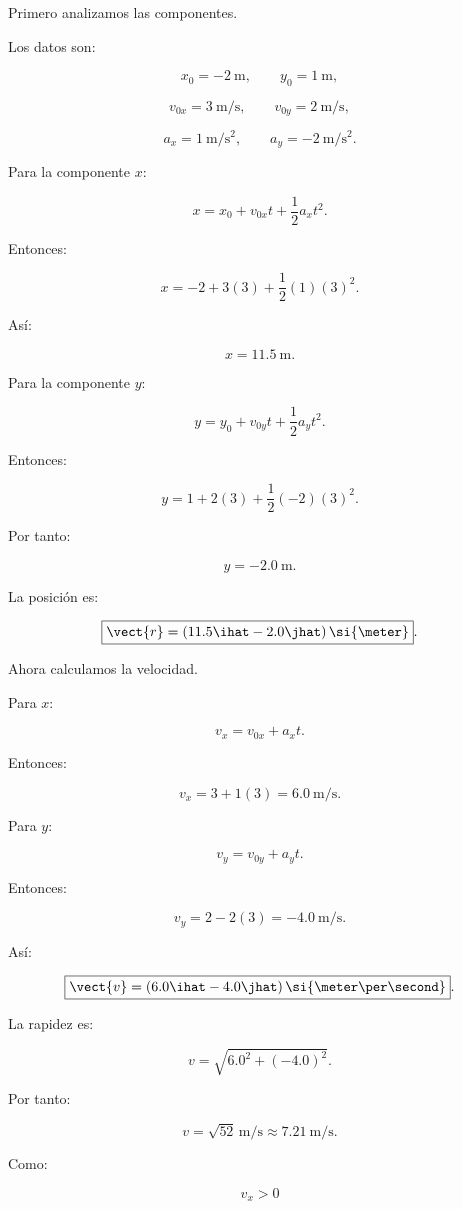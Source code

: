 Primero analizamos las componentes.

Los datos son:

\[
x_0=-\SI{2}{\meter},
\qquad
y_0=\SI{1}{\meter},
\]

\[
v_{0x}=\SI{3}{\meter\per\second},
\qquad
v_{0y}=\SI{2}{\meter\per\second},
\]

\[
a_x=\SI{1}{\meter\per\second\squared},
\qquad
a_y=-\SI{2}{\meter\per\second\squared}.
\]

Para la componente \(x\):

\[
x
=
x_0+v_{0x}t+\frac{1}{2}a_xt^2.
\]

Entonces:

\[
x
=
-2+3(3)+\frac{1}{2}(1)(3)^2.
\]

Así:

\[
x=\SI{11.5}{\meter}.
\]

Para la componente \(y\):

\[
y
=
y_0+v_{0y}t+\frac{1}{2}a_yt^2.
\]

Entonces:

\[
y
=
1+2(3)+\frac{1}{2}(-2)(3)^2.
\]

Por tanto:

\[
y=-\SI{2.0}{\meter}.
\]

La posición es:

\[
\boxed{
\vect{r}
=
(11.5\ihat-2.0\jhat)\,\si{\meter}
}.
\]

Ahora calculamos la velocidad.

Para \(x\):

\[
v_x
=
v_{0x}+a_xt.
\]

Entonces:

\[
v_x
=
3+1(3)
=
\SI{6.0}{\meter\per\second}.
\]

Para \(y\):

\[
v_y
=
v_{0y}+a_yt.
\]

Entonces:

\[
v_y
=
2-2(3)
=
-\SI{4.0}{\meter\per\second}.
\]

Así:

\[
\boxed{
\vect{v}
=
(6.0\ihat-4.0\jhat)\,
\si{\meter\per\second}
}.
\]

La rapidez es:

\[
v
=
\sqrt{6.0^2+(-4.0)^2}.
\]

Por tanto:

\[
\boxed{
v
=
\sqrt{52}\,
\si{\meter\per\second}
\approx
\SI{7.21}{\meter\per\second}
}.
\]

Como:

\[
v_x>0
\]

